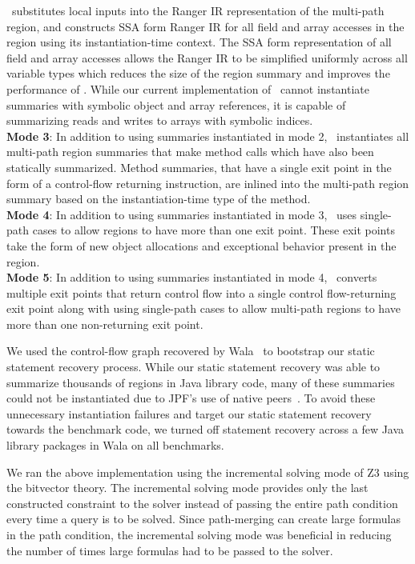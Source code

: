 %
\tool\ substitutes local inputs into the Ranger IR representation of the multi-path region, and constructs SSA form
Ranger IR for all field and array accesses in the region using its instantiation-time context.
%
The SSA form representation of all field and array accesses allows the Ranger IR to be simplified uniformly across all
variable types which reduces the size of the region summary and improves the performance of \tool.
%
While our current implementation of \tool\ cannot instantiate summaries with symbolic object and array
references, it is capable of summarizing reads and writes to arrays with symbolic indices.\\
%
\textbf{Mode 3}: In addition to using summaries instantiated in mode 2, \tool\ instantiates all multi-path region
summaries that make method calls which have also been statically summarized.
%
Method summaries, that have a single exit point in the form of a control-flow returning instruction, are inlined into
the multi-path region summary based on the instantiation-time type of the method.\\
%
\textbf{Mode 4}: In addition to using summaries instantiated in mode 3, \tool\ uses single-path cases to allow
regions to have more than one exit point.
%
These exit points take the form of new object allocations and exceptional behavior present in the region.\\
%
\textbf{Mode 5}: In addition to using summaries instantiated in mode 4, \tool\ converts multiple exit points that return
control flow into a single control flow-returning exit point along with using single-path
cases to allow multi-path regions to have more than one non-returning exit point.

We used the control-flow graph recovered by Wala~\cite{Wala} to bootstrap our static statement recovery process.
%
While our static statement recovery was able to summarize thousands of regions in Java library code, many of these
summaries could not be instantiated due to JPF\rq s use of native peers~\cite{jpf-mji}.
%
To avoid these unnecessary instantiation failures and target our static statement recovery towards the benchmark code,
we turned off statement recovery across a few Java library packages in Wala on all benchmarks.

We ran the above implementation using the incremental solving mode of Z3 using the bitvector theory.
%
The incremental solving mode provides only the last constructed constraint to the solver instead of passing the entire
path condition every time a query is to be solved.
%
Since path-merging can create large formulas in the path condition, the incremental solving mode was beneficial in
reducing the number of times large formulas had to be passed to the solver.
%
